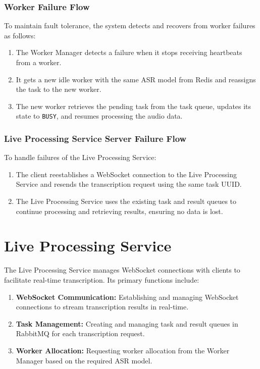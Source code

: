 \subsubsection{Worker Failure Flow}
To maintain fault tolerance, the system detects and recovers from worker failures as follows:
\begin{enumerate}
    \item The Worker Manager detects a failure when it stops receiving heartbeats from a worker.
    \item It gets a new idle worker with the same ASR model from Redis and reassigns the task to the new worker.
    \item The new worker retrieves the pending task from the task queue, updates its state to \texttt{BUSY}, and resumes processing the audio data.
\end{enumerate}

\subsubsection{Live Processing Service Server Failure Flow}
To handle failures of the Live Processing Service:
\begin{enumerate}
    \item The client reestablishes a WebSocket connection to the Live Processing Service and resends the transcription request using the same task UUID.
    \item The Live Processing Service uses the existing task and result queues to continue processing and retrieving results, ensuring no data is lost.
\end{enumerate}

\section{Live Processing Service}
The Live Processing Service manages WebSocket connections with clients to facilitate real-time transcription. Its primary functions include:
\begin{enumerate}
  \item \textbf{WebSocket Communication:} Establishing and managing WebSocket connections to stream transcription results in real-time.
  \item \textbf{Task Management:} Creating and managing task and result queues in RabbitMQ for each transcription request.
  \item \textbf{Worker Allocation:} Requesting worker allocation from the Worker Manager based on the required ASR model.
\end{enumerate}



